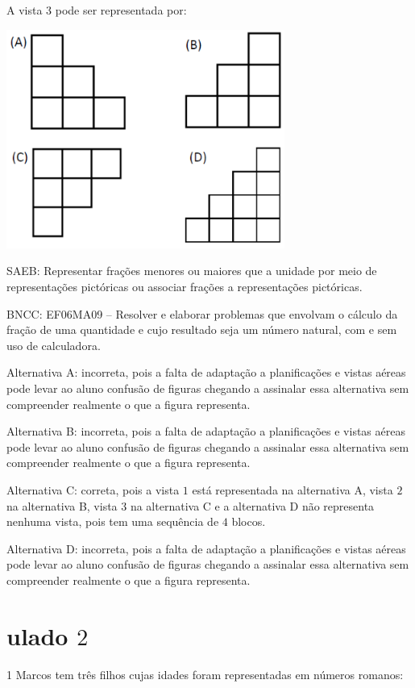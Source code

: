 A vista $3$ pode ser representada por:

\includegraphics[width=3.59198in,height=2.82524in]{./imgSAEB_6_MAT/media/image113.png}

SAEB: Representar frações menores ou maiores que a unidade por meio de
representações pictóricas ou associar frações a representações
pictóricas.

BNCC: EF06MA09 -- Resolver e elaborar problemas que envolvam o cálculo
da fração de uma quantidade e cujo resultado seja um número natural, com
e sem uso de calculadora.

Alternativa A: incorreta, pois a falta de adaptação a planificações e
vistas aéreas pode levar ao aluno confusão de figuras chegando a
assinalar essa alternativa sem compreender realmente o que a figura
representa.

Alternativa B: incorreta, pois a falta de adaptação a planificações e
vistas aéreas pode levar ao aluno confusão de figuras chegando a
assinalar essa alternativa sem compreender realmente o que a figura
representa.

Alternativa C: correta, pois a vista $1$ está representada na alternativa
A, vista $2$ na alternativa B, vista $3$ na alternativa C e a alternativa D
não representa nenhuma vista, pois tem uma sequência de $4$ blocos.

Alternativa D: incorreta, pois a falta de adaptação a planificações e
vistas aéreas pode levar ao aluno confusão de figuras chegando a
assinalar essa alternativa sem compreender realmente o que a figura
representa.

\chapter{ulado $2$}

\num{1}  Marcos tem três filhos cujas idades foram representadas em números
romanos:

